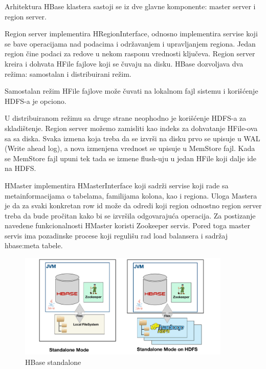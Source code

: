 \documentclass[12pt,oneside]{memoir}
\begin{document}
Arhitektura HBase klastera sastoji se iz dve glavne komponente:  master server i region server. 

Region server implementira HRegionInterface, odnosno implementira servise koji se bave operacijama nad podacima i održavanjem i upravljanjem regiona. Jedan region čine podaci za redove u nekom rasponu vrednosti ključeva. Region server kreira i dohvata HFile fajlove koji se čuvaju na disku. HBase dozvoljava dva režima: samostalan i distribuirani režim.

Samostalan režim HFile fajlove može čuvati na lokalnom fajl sistemu i korišćenje HDFS-a je opciono.

U distribuiranom režimu sa druge strane neophodno je korišćenje HDFS-a za skladištenje. Region server možemo zamisliti kao indeks za dohvatanje HFile-ova sa sa diska.  Svaka izmena koja treba da se izvrši na disku prvo se upisuje u WAL (Write ahead log), a nova izmenjena vrednost se upisuje u MemStore fajl. Kada se MemStore fajl upuni tek tada se izmene flush-uju u jedan HFile koji dalje ide na HDFS. 

HMaster implementira HMasterInterface koji sadrži servise koji rade sa metainformacijama o tabelama, familijama kolona, kao i regiona. Uloga Mastera je da za svaki konkretan row id može da odredi koji region odnostno region server treba da bude pročitan kako bi se izvršila odgovarajuća operacija. Za postizanje navedene funkcionalnosti HMaster koristi Zookeeper \cite{BigTable} servis. Pored toga master servis ima pozadinske procese koji regulišu rad load balansera i sadržaj hbase:meta tabele.

\begin{figure}[!ht]
  \centering
  \includegraphics[width=0.9\textwidth]{hbase-standalone.png}
  \caption{HBase standalone}
  \label{fig:grafikon}
\end{figure}
\end{document}
